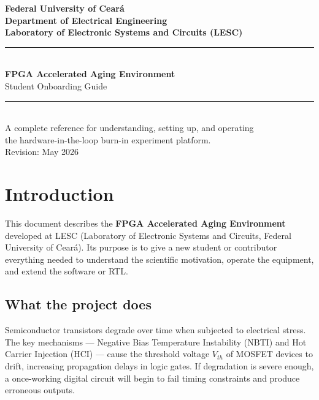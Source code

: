 \documentclass[12pt, a4paper]{report}
\begin{document}
\begin{titlepage}
  \centering
  \vspace*{2cm}
  {\Large\bfseries Federal University of Ceará\\[6pt]
   Department of Electrical Engineering\\[6pt]
   Laboratory of Electronic Systems and Circuits (LESC)\\[2cm]}
  \rule{\linewidth}{1pt}\\[0.5cm]
  {\Huge\bfseries FPGA Accelerated Aging Environment\\[0.4cm]}
  {\Large Student Onboarding Guide\\[0.3cm]}
  \rule{\linewidth}{1pt}\\[2cm]
  {\large A complete reference for understanding, setting up, and operating\\
   the hardware-in-the-loop burn-in experiment platform.\\[3cm]}
  {\normalsize Revision: May 2026\\[1cm]}
  \vfill
\end{titlepage}

\tableofcontents
\newpage

\chapter{Introduction}

This document describes the \textbf{FPGA Accelerated Aging Environment} developed at
LESC (Laboratory of Electronic Systems and Circuits, Federal University of Ceará).
Its purpose is to give a new student or contributor everything needed to understand
the scientific motivation, operate the equipment, and extend the software or RTL.

\section{What the project does}

Semiconductor transistors degrade over time when subjected to electrical stress.
The key mechanisms --- Negative Bias Temperature Instability (NBTI) and Hot Carrier
Injection (HCI) --- cause the threshold voltage $V_{th}$ of MOSFET devices to drift,
increasing propagation delays in logic gates. If degradation is severe enough, a once-working
digital circuit will begin to fail timing constraints and produce erroneous outputs.
\end{document}
